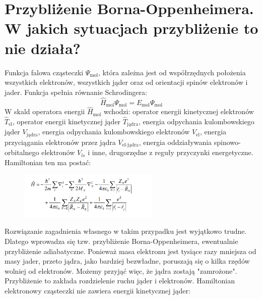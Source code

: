 \documentclass{article}
\begin{document}
\section{Przybliżenie Borna-Oppenheimera. W jakich sytuacjach przybliżenie to nie działa?}
Funkcja falowa cząsteczki $\Psi_\text{mol}$, która zależna jest od współrzędnych położenia wszystkich elektronów, wszystkich jąder oraz od orientacji spinów elektronów i jader. Funkcja spełnia równanie Schrodingera:
\begin{equation*}
    \hat{H}_\text{mol}\Psi_\text{mol}=E_\text{mol}\Psi_\text{mol}
\end{equation*}
W skald operatora energii $\hat{H}_\text{mol}$ wchodzi: operator energii kinetycznej elektronów $\hat{T}_\text{el}$, operator energii kinetycznej jąder $\hat{T}_\text{jądra}$, energia odpychania kulombowskiego jąder $V_\text{jądra}$, energia odpychania kulombowskiego elektronów $V_\text{el}$, energia przyciągania elektronów przez jądra $V_\text{el-jądra}$, energia oddziaływania spinowo-orbitalnego elektronów $V_{ls}$ i inne, drugorzędne z reguły przyczynki energetyczne. Hamiltonian ten ma postać:
\begin{figure}[H]
    \centering
    \includegraphics[width=0.6\textwidth]{images/hamiltonian cząsteczki.png}
\end{figure}
Rozwiązanie zagadnienia własnego w takim przypadku jest wyjątkowo trudne. Dlatego wprowadza się tzw. przybliżenie Borna-Oppenheimera, ewentualnie przybliżenie adiabatyczne. Ponieważ masa elektronu jest tysiące razy mniejsza od masy jader, przeto jądra, jako bardziej bezwładne, poruszają się o kilka rzędów wolniej od elektronów. Możemy przyjąć więc, że jądra zostają "zamrożone". Przybliżenie to zakłada rozdzielenie ruchu jąder i elektronów. Hamiltonian elektronowy cząsteczki nie zawiera energii kinetycznej jąder:
\end{document}
